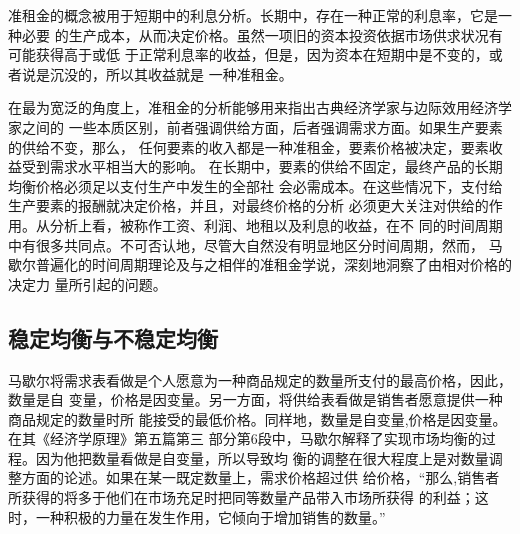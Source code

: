 准租金的概念被用于短期中的利息分析。长期中，存在一种正常的利息率，它是一种必要
的生产成本，从而决定价格。虽然一项旧的资本投资依据市场供求状况有可能获得高于或低
于正常利息率的收益，但是，因为资本在短期中是不变的，或者说是沉没的，所以其收益就是
一种准租金。

在最为宽泛的角度上，准租金的分析能够用来指出古典经济学家与边际效用经济学家之间的
一些本质区别，前者强调供给方面，后者强调需求方面。如果生产要素的供给不变，那么，
任何要素的收入都是一种准租金，要素价格被决定，要素收益受到需求水平相当大的影响。
在长期中，要素的供给不固定，最终产品的长期均衡价格必须足以支付生产中发生的全部社
会必需成本。在这些情况下，支付给生产要素的报酬就决定价格，并且，对最终价格的分析
必须更大关注对供给的作用。从分析上看，被称作工资、利润、地租以及利息的收益，在不
同的时间周期中有很多共同点。不可否认地，尽管大自然没有明显地区分时间周期，然而，
马歇尔普遍化的时间周期理论及与之相伴的准租金学说，深刻地洞察了由相对价格的决定力
量所引起的问题。

\subsection{稳定均衡与不稳定均衡}

马歇尔将需求表看做是个人愿意为一种商品规定的数量所支付的最高价格，因此，数量是自
变量，价格是因变量。另一方面，将供给表看做是销售者愿意提供一种商品规定的数量时所
能接受的最低价格。同样地，数量是自变量,价格是因变量。在其《经济学原理》第五篇第三
部分第6段中，马歇尔解释了实现市场均衡的过程。因为他把数量看做是自变量，所以导致均
衡的调整在很大程度上是对数量调整方面的论述。如果在某一既定数量上，需求价格超过供
给价格，“那么,销售者所获得的将多于他们在市场充足时把同等数量产品带入市场所获得
的利益；这时，一种积极的力量在发生作用，它倾向于增加销售的数量。”


